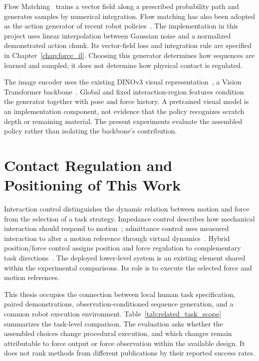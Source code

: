 Flow Matching~\cite{lipman2023flow} trains a vector field along a prescribed probability path and generates samples by numerical integration. Flow matching has also been adopted as the action generator of recent robot policies~\cite{black2024pi0}. The implementation in this project uses linear interpolation between Gaussian noise and a normalized demonstrated action chunk. Its vector-field loss and integration rule are specified in Chapter~\ref{chap:force_il}. Choosing this generator determines how sequences are learned and sampled; it does not determine how physical contact is regulated.

The image encoder uses the existing DINOv3 visual representation~\cite{simeoni2025dinov3}, a Vision Transformer backbone~\cite{dosovitskiy2021vit}. Global and fixed interaction-region features condition the generator together with pose and force history. A pretrained visual model is an implementation component, not evidence that the policy recognizes scratch depth or remaining material. The present experiments evaluate the assembled policy rather than isolating the backbone's contribution.

\section{Contact Regulation and Positioning of This Work}
Interaction control distinguishes the dynamic relation between motion and force from the selection of a task strategy. Impedance control describes how mechanical interaction should respond to motion~\cite{hogan1985impedance}; admittance control uses measured interaction to alter a motion reference through virtual dynamics~\cite{keemink2018admittance}. Hybrid position/force control assigns position and force regulation to complementary task directions~\cite{raibert1981hybrid}. The deployed lower-level system is an existing element shared within the experimental comparisons. Its role is to execute the selected force and motion references.

This thesis occupies the connection between local human task specification, paired demonstrations, observation-conditioned sequence generation, and a common robot execution environment. Table~\ref{tab:related_task_scope} summarizes the task-level comparison. The evaluation asks whether the assembled choices change procedural execution, and which changes remain attributable to force output or force observation within the available design. It does not rank methods from different publications by their reported success rates.

